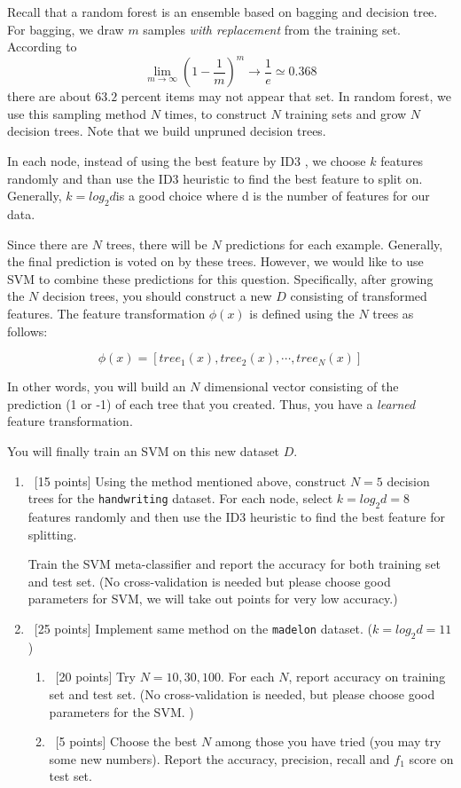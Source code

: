 Recall that a random forest is an ensemble based on bagging and
decision tree. For bagging, we draw $m$ samples {\em with replacement}
from the training set. According to
$$\lim_{m \to \infty}(1-\frac{1}{m})^m \to \frac{1}{e} \simeq 0.368$$
there are about $63.2 $ percent items may not appear that set. In
random forest, we use this sampling method $N$ times, to construct $N$
training sets and grow $N$ decision trees. Note that we build unpruned
decision trees.

In each node, instead of using the best feature by ID3 , we choose $k$
features randomly and than use the ID3 heuristic to find the best
feature to split on. Generally, $k = log_2 d $is a good choice where d
is the number of features for our data.

Since there are $N$ trees, there will be $N$ predictions for each
example. Generally, the final prediction is voted on by these trees.
However, we would like to use SVM to combine these predictions for
this question. Specifically, after growing the $N$ decision trees, you
should construct a new $D$ consisting of transformed features. The
feature transformation $\phi(x)$ is defined using the $N$ trees as
follows:

$$\phi(x) = [tree_1(x), tree_2(x), \cdots, tree_{N} (x)]$$  

In other words, you will build an $N$ dimensional vector consisting of
the prediction (1 or -1) of each tree that you created. Thus, you have
a {\em learned} feature transformation.

You will finally train an SVM on this new dataset $D$.

\begin{enumerate}
\item ~[15 points] Using the method mentioned above, construct
  $N = 5$ decision trees for the {\tt handwriting} dataset. For each
  node, select $k = log_2 d = 8$ features randomly and then use the
  ID3 heuristic to find the best feature for splitting.

  Train the SVM meta-classifier and report the accuracy for both
  training set and test set. (No cross-validation is needed but
  please choose good parameters for SVM, we will take out points for
  very low accuracy.)

\item ~[25 points] Implement same method on the {\tt madelon}
  dataset. ($k = log_2 d = 11$)
  \begin{enumerate}
  \item ~[20 points] Try $N = 10, 30, 100$. For each $N$, report
    accuracy on training set and test set. (No cross-validation is
    needed, but please choose good parameters for the SVM. )

  \item ~[5 points] Choose the best $N$ among those you have tried
    (you may try some new numbers). Report the accuracy, precision,
    recall and $f_1$ score on test set.
  \end{enumerate}
\end{enumerate}

